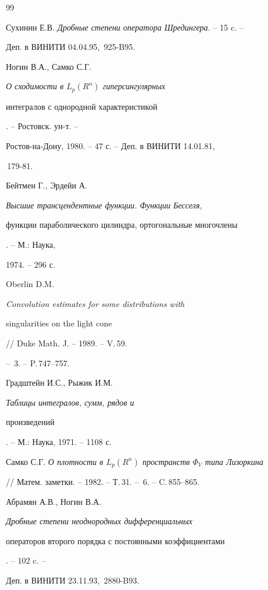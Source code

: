 \begin{thebibliography}{99}


Сухинин Е.В. {\em Дробные степени оператора Шредингера}. -- 15 c. --


Деп. в ВИНИТИ 04.04.95, \No\,925-B95.




Ногин В.А., Самко С.Г. {\em О сходимости в $L_p(R^n)$ гиперсингулярных


интегралов с однородной характеристикой}. -- Ростовск. ун-т. --


Ростов-на-Дону, 1980. -- 47 с. -- Деп. в ВИНИТИ 14.01.81,


\No\,179-81. 




Бейтмен Г., Эрдейи А. {\em Высшие трансцендентные функции. Функции Бесселя,


функции параболического цилиндра, ортогональные многочлены}. -- М.: Наука,


1974. -- 296 с.




Oberlin D.M. {\em Convolution estimates for some distributions with


singularities on the light cone} // Duke Math. J. -- 1989. -- V.\,59.


-- \No\,3. -- P.\,747--757.




Градштейн И.С., Рыжик И.М. {\em Таблицы интегралов, сумм, рядов и


произведений}. -- М.: Наука, 1971. -- 1108 с.




Самко С.Г. {\em О плотности в $L_p(R^n)$ пространств $\Phi_V$ типа Лизоркина}


// Матем. заметки. -- 1982. -- Т.\,31. -- \No\,6. -- C.\,855--865.




Абрамян А.В., Ногин В.А. {\em Дробные степени неоднородных дифференциальных


операторов второго порядка с постоянными коэффициентами}. -- 102 c. --


Деп. в ВИНИТИ 23.11.93, \No\,2880-B93.





\end{thebibliography}





\vskip 2cm












\label{end}








